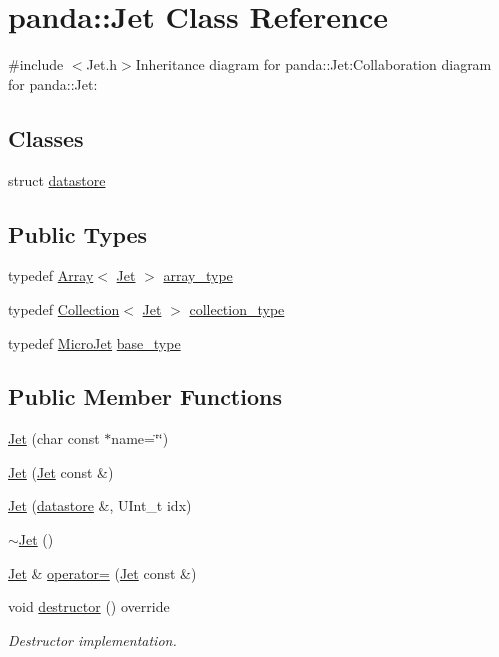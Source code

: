 \hypertarget{classpanda_1_1Jet}{
\section{panda::Jet Class Reference}
\label{classpanda_1_1Jet}
}


{\ttfamily \#include $<$Jet.h$>$}Inheritance diagram for panda::Jet:Collaboration diagram for panda::Jet:\subsection*{Classes}
\begin{DoxyCompactItemize}
\item 
struct \hyperlink{structpanda_1_1Jet_1_1datastore}{datastore}
\end{DoxyCompactItemize}
\subsection*{Public Types}
\begin{DoxyCompactItemize}
\item 
typedef \hyperlink{classpanda_1_1Array}{Array}$<$ \hyperlink{classpanda_1_1Jet}{Jet} $>$ \hyperlink{classpanda_1_1Jet_a02ed819ca5ca46b0b3b212dbd56bce57}{array\_\-type}
\item 
typedef \hyperlink{classpanda_1_1Collection}{Collection}$<$ \hyperlink{classpanda_1_1Jet}{Jet} $>$ \hyperlink{classpanda_1_1Jet_abc4f1b55581c1f9a65d14ca360458c40}{collection\_\-type}
\item 
typedef \hyperlink{classpanda_1_1MicroJet}{MicroJet} \hyperlink{classpanda_1_1Jet_a4fbfc283916dbd345b13a61396b878cf}{base\_\-type}
\end{DoxyCompactItemize}
\subsection*{Public Member Functions}
\begin{DoxyCompactItemize}
\item 
\hyperlink{classpanda_1_1Jet_a68b4c3afba44d3b71bb2d4c9b015869f}{Jet} (char const $\ast$name=\char`\"{}\char`\"{})
\item 
\hyperlink{classpanda_1_1Jet_acf20ecedd6baf62791de5d0d8c63a996}{Jet} (\hyperlink{classpanda_1_1Jet}{Jet} const \&)
\item 
\hyperlink{classpanda_1_1Jet_a985cc87d1d193a2280e692ab9abc4e64}{Jet} (\hyperlink{structpanda_1_1Element_1_1datastore}{datastore} \&, UInt\_\-t idx)
\item 
\hyperlink{classpanda_1_1Jet_a00a058429c04ae0709f4383cec5b0410}{$\sim$Jet} ()
\item 
\hyperlink{classpanda_1_1Jet}{Jet} \& \hyperlink{classpanda_1_1Jet_a06509e069beffe7d5fa12a5450254e6a}{operator=} (\hyperlink{classpanda_1_1Jet}{Jet} const \&)
\item 
void \hyperlink{classpanda_1_1Jet_adbd430a93e346588348e1eebaa90c42a}{destructor} () override
\begin{DoxyCompactList}\small\item\em Destructor implementation. \item\end{DoxyCompactList}\end{DoxyCompactItemize}
